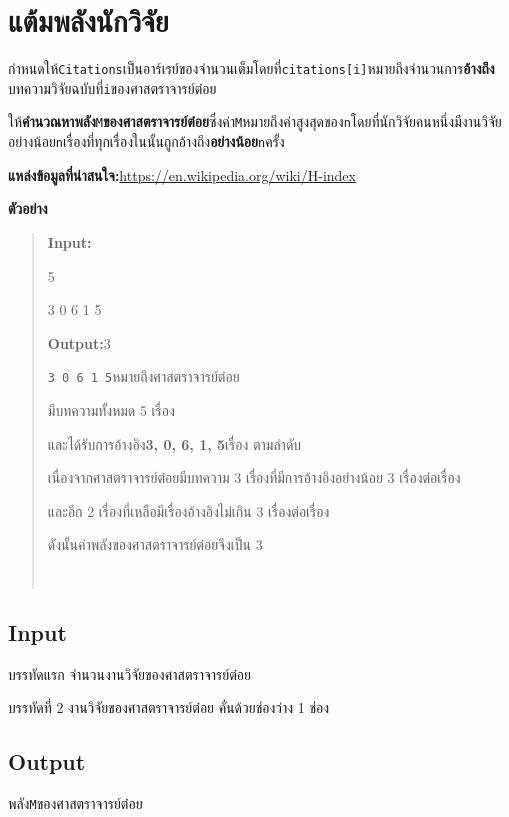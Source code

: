 \documentclass{article}
\begin{document}
\section*{แต้มพลังนักวิจัย}

กำหนดให้\texttt{Citations}เป็นอาร์เรย์ของจำนวนเต็มโดยที่\texttt{citations{[}i{]}}หมายถึงจำนวนการ\textbf{อ้างถึง}บทความวิจัยฉบับที่\texttt{i}ของศาสตราจารย์ต๋อย

ให้\textbf{คำนวณหาพลัง}\texttt{M}\textbf{ของศาสตราจารย์ต๋อย}ซึ่งค่า\texttt{M}หมายถึงค่าสูงสุดของ\texttt{n}โดยที่นักวิจัยคนหนึ่งมีงานวิจัยอย่างน้อย\texttt{n}เรื่องที่ทุกเรื่องในนั้นถูกอ้างถึง\textbf{อย่างน้อย}\texttt{n}ครั้ง\\



\hfill\break



{\textbf{แหล่งข้อมูลที่น่าสนใจ:}}{\url{https://en.wikipedia.org/wiki/H-index}}



\hfill\break



\textbf{ตัวอย่าง}



\begin{quote}

\textbf{Input:}



5



3 0 6 1 5



\textbf{Output:}3



\texttt{3\ 0\ 6\ 1\ 5}หมายถึง{ศาสตราจารย์ต๋อย}{มีบทความทั้งหมด 5 เรื่อง

และได้รับการอ้างอิง\textbf{3, 0, 6, 1, 5}เรื่อง ตามลำดับ}



{{เนื่องจาก{ศาสตราจารย์ต๋อย}มีบทความ 3 เรื่องที่มีการอ้างอิงอย่างน้อย 3 เรื่องต่อเรื่อง

และอีก 2 เรื่องที่เหลือมีเรื่องอ้างอิงไม่เกิน 3 เรื่องต่อเรื่อง

ดังนั้นค่าพลังของ{ศาสตราจารย์ต๋อย}จึงเป็น 3}\\

}

\end{quote}



\subsection*{Input}
บรรทัดแรก จำนวนงาน{วิจัยของ}{ศาสตราจารย์ต๋อย}



บรรทัดที่ 2 งานวิจัยของ{ศาสตราจารย์ต๋อย คั่นด้วยช่องว่าง 1 ช่อง}



\subsection*{Output}
{พลัง}\texttt{M}{ของศาสตราจารย์ต๋อย}\\
\end{document}
